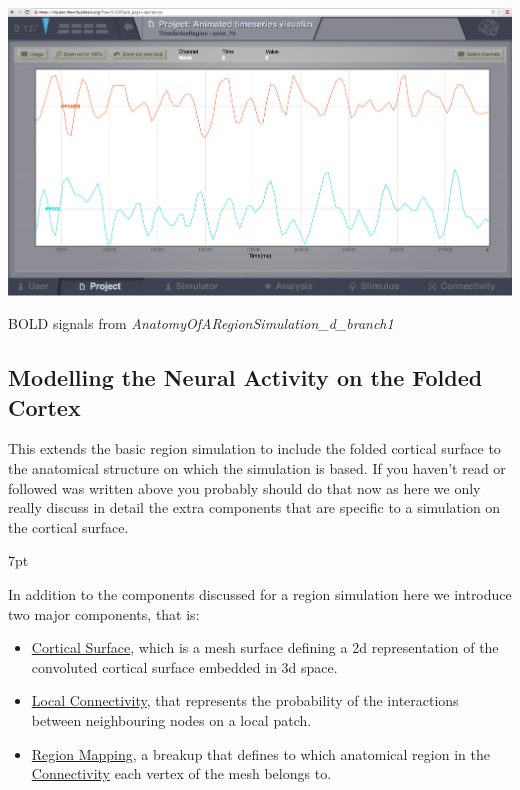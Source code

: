 \documentclass{tufte-handout}
\newenvironment{blah}{%
  \def\FrameCommand{%
    \hspace{1pt}%
    {\color{DarkOrange}\vrule width 2pt}%
    {\color{PeachPuff}\vrule width 4pt}%
    \colorbox{PeachPuff}%
  }%
  \MakeFramed{\advance\hsize-\width\FrameRestore}%
  \noindent\hspace{-4.55pt}%
  \begin{adjustwidth}{}{7pt}%
  \vspace{2pt}\vspace{2pt}%
}
{%
  \vspace{2pt}\end{adjustwidth}\endMakeFramed%
}
\begin{document}
\begin{marginfigure}%
\includegraphics[width=\linewidth]{Handout_UI_BuildingYourOwnBrainNetworkModel_BOLD}%
  \caption{BOLD signals from \textit{AnatomyOfARegionSimulation\_d\_branch1}}%
  \label{fig:BOLD}%
\end{marginfigure}


\subsection{Modelling the Neural Activity on the Folded Cortex}\label{sec:surface_simulations}

This extends the basic region simulation to include the folded cortical surface to the anatomical structure on which the simulation is based. If you haven't read or followed was written above you probably should do that now as here we only really discuss in detail the extra components that are specific to a simulation on the cortical surface.

\begin{blah}
In addition to the components discussed for a
region simulation here we introduce two major components, that is:
\begin{itemize}
\item \underline{Cortical Surface}, which is a mesh surface defining
a 2d representation of the convoluted cortical surface embedded in 3d space.
\item \underline{Local Connectivity}, that represents the probability of the interactions between neighbouring nodes on a local patch. 
\item \underline{Region Mapping},  a breakup that defines to which anatomical region in the \underline{Connectivity} each vertex of the mesh belongs to. 
\end{itemize}
\end{blah}
\end{document}
